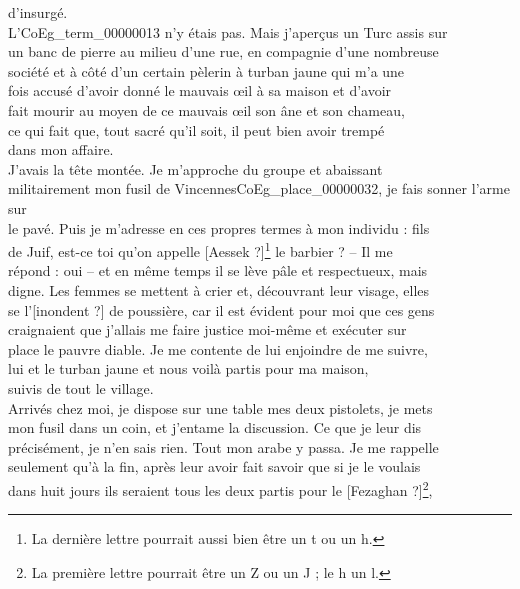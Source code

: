 \documentclass{book}
\begin{document}
d’insurgé.\\
\indent L’\gls{CoEg_term_00000013} n’y étais pas. Mais j’aperçus un Turc assis sur\\
un banc de pierre au milieu d’une rue, en compagnie d’une nombreuse\\
société et à côté d’un certain pèlerin à turban jaune qui m’a une\\
fois accusé d’avoir donné le mauvais œil à sa maison et d’avoir\\
fait mourir au moyen de ce mauvais œil son âne et son chameau,\\
ce qui fait que, tout sacré qu’il soit, il peut bien avoir trempé\\
dans mon affaire.\\
\indent J’avais la tête montée. Je m’approche du groupe et abaissant\\
militairement mon fusil de Vincennes\gls{CoEg_place_00000032}, je fais sonner l’arme sur\\
le pavé. Puis je m’adresse en ces propres termes à mon individu : fils\\
de Juif, est-ce toi qu’on appelle {[Aessek ?]}\footnote{La dernière lettre pourrait aussi bien être un t ou un h.} le barbier ? – Il me\\
répond : oui – et en même temps il se lève pâle et respectueux, mais\\
digne. Les femmes se mettent à crier et, découvrant leur visage, elles\\
se l’{[inondent ?]} de poussière, car il est évident pour moi que ces gens\\
craignaient que j’allais me faire justice moi-même et exécuter sur\\
place le pauvre diable. Je me contente de lui enjoindre de me suivre,\\
lui et le turban jaune et nous voilà partis pour ma maison,\\
suivis de tout le village.\\
\indent Arrivés chez moi, je dispose sur une table mes deux pistolets, je mets\\
mon fusil dans un coin, et j’entame la discussion. Ce que je leur dis\\
précisément, je n’en sais rien. Tout mon arabe y passa. Je me rappelle\\
seulement qu’à la fin, après leur avoir fait savoir que si je le voulais\\
dans huit jours ils seraient tous les deux partis pour le {[Fezaghan ?]}\footnote{La première lettre pourrait être un Z ou un J ; le h un l.},\\
\end{document}
